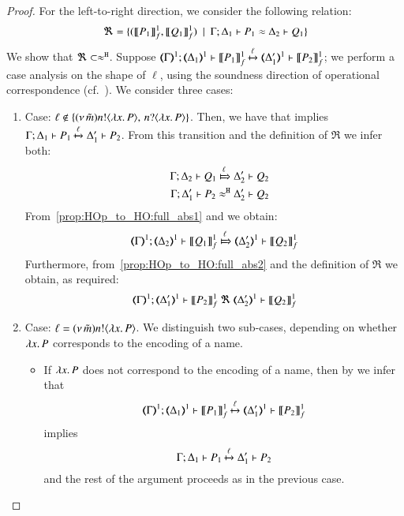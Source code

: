 \begin{proof}
	\noi For the left-to-right direction, we consider the following relation:
%
	\[
		\Re = \{
		(\llbracket P_1\rrbracket^1_f, \llbracket Q_1\rrbracket^1_f)
		\ \ |\ \  \Gamma; \Delta_1 \vdash P_1 \approx \Delta_2 \vdash Q_1\}
	\]
%
	We show that $\Re \subset \approx^\mathtt{H}$.
	Suppose $\horel{\mapt{\Gamma}^{1}}{\mapt{\Delta_1}^{1}}{\pmapp{P_1}{1}{f}}{\hby{\ell}}{\mapt{\Delta_1'}^{1}}{\pmapp{P_2}{1}{f}}$; 
we perform a case analysis on the shape of ${\ell}$, using 
the soundness direction of operational correspondence (cf.~).
			We consider three cases:
	\begin{enumerate}[1.]

	\item Case: $\ell \notin \{(\nu\, \tilde{m}) n ! \langle \lambda x.\,P \rangle,\, n ? \langle \lambda x.\,P \rangle\}$.
	Then, we have that 
	 implies
		$\Gamma; \Delta_1 \vdash P_1 \xmapsto{\ell} \Delta_1' \vdash P_2$. 
From this transition and the definition of $\Re$ we infer both:
%
	\begin{eqnarray}
		&&\horel{\Gamma}{\Delta_2}{Q_1}{\Hby{\ell}}{\Delta_2'}{Q_2}
		\label{prop:HOp_to_HO:full_abs1}
		\\
		&&\horel{\Gamma}{\Delta_1'}{P_2}{\hwb}{\Delta_2'}{Q_2}
		\label{prop:HOp_to_HO:full_abs2}
	\end{eqnarray}
%
	\noi From~\eqref{prop:HOp_to_HO:full_abs1} and  we obtain:
%
	\[
		\horel{\mapt{\Gamma}^{1}}{\mapt{\Delta_2}^{1}}{\pmapp{Q_1}{1}{f}}{\Hby{\ell}}{\mapt{\Delta_2'}^{1}}{\pmapp{Q_2}{1}{f}}
	\]
%
	\noi Furthermore, from~\eqref{prop:HOp_to_HO:full_abs2} and the definition of $\Re$ we obtain, as required:
%
	\[
		\horel{\mapt{\Gamma}^{1}}{\mapt{\Delta_1'}^{1}}{\pmapp{P_2}{1}{f}}{\ \Re\ }{\mapt{\Delta_2'}^{1}}{\pmapp{Q_2}{1}{f}}
	\]
	\item Case: $\ell = (\nu\, \tilde{m}) n ! \langle \lambda x.\,P \rangle$.
    We distinguish two sub-cases, depending on whether $\lambda x.\,P$ corresponds to the encoding of a name. 
    \begin{itemize}
    \item If $\lambda x.\,P$  does not correspond to the encoding of a name, then 
	by  we infer that
%
	\[
		\horel{\mapt{\Gamma}^{1}}{\mapt{\Delta_1}^{1}}{\pmapp{P_1}{1}{f}}{\hby{\ell}}{\mapt{\Delta_1'}^{1}}{\pmapp{P_2}{1}{f}}
	\]
%
	\noi implies
%
	\[
		\Gamma; \Delta_1 \vdash P_1 \xmapsto{\ell} \Delta_1' \vdash P_2
	\]
%
	and the rest of the argument proceeds as in the previous case.


\end{itemize}
\end{enumerate}
\end{proof}
